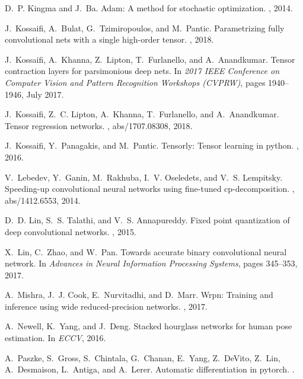 \documentclass[10pt,twocolumn,letterpaper]{article}
\begin{document}
{\begin{thebibliography}{10}
D.~P. Kingma and J.~Ba.
\newblock Adam: A method for stochastic optimization.
, 2014.

J.~Kossaifi, A.~Bulat, G.~Tzimiropoulos, and M.~Pantic.
\newblock Parametrizing fully convolutional nets with a single high-order
  tensor.
, 2018.

J.~Kossaifi, A.~Khanna, Z.~Lipton, T.~Furlanello, and A.~Anandkumar.
\newblock Tensor contraction layers for parsimonious deep nets.
\newblock In {\em 2017 IEEE Conference on Computer Vision and Pattern
  Recognition Workshops (CVPRW)}, pages 1940--1946, July 2017.

J.~Kossaifi, Z.~C. Lipton, A.~Khanna, T.~Furlanello, and A.~Anandkumar.
\newblock Tensor regression networks.
, abs/1707.08308, 2018.

J.~Kossaifi, Y.~Panagakis, and M.~Pantic.
\newblock Tensorly: Tensor learning in python.
, 2016.

V.~Lebedev, Y.~Ganin, M.~Rakhuba, I.~V. Oseledets, and V.~S. Lempitsky.
\newblock Speeding-up convolutional neural networks using fine-tuned
  cp-decomposition.
, abs/1412.6553, 2014.

D.~D. Lin, S.~S. Talathi, and V.~S. Annapureddy.
\newblock Fixed point quantization of deep convolutional networks.
, 2015.

X.~Lin, C.~Zhao, and W.~Pan.
\newblock Towards accurate binary convolutional neural network.
\newblock In {\em Advances in Neural Information Processing Systems}, pages
  345--353, 2017.

A.~Mishra, J.~J. Cook, E.~Nurvitadhi, and D.~Marr.
\newblock Wrpn: Training and inference using wide reduced-precision networks.
, 2017.

A.~Newell, K.~Yang, and J.~Deng.
\newblock Stacked hourglass networks for human pose estimation.
\newblock In {\em ECCV}, 2016.

A.~Paszke, S.~Gross, S.~Chintala, G.~Chanan, E.~Yang, Z.~DeVito, Z.~Lin,
  A.~Desmaison, L.~Antiga, and A.~Lerer.
\newblock Automatic differentiation in pytorch.
.


\end{thebibliography}}
\end{document}
